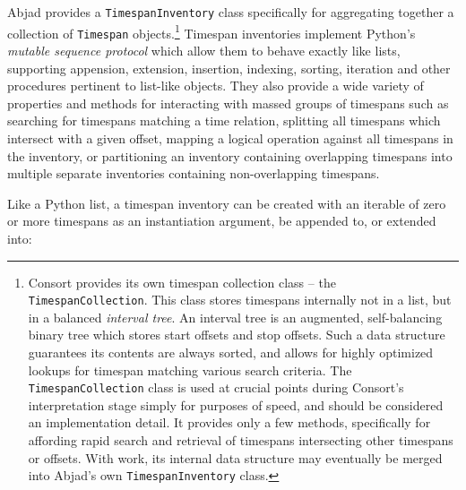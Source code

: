 
Abjad provides a \texttt{TimespanInventory} class specifically for aggregating
together a collection of \texttt{Timespan} objects.\footnote{ Consort provides
its own timespan collection class -- the \texttt{TimespanCollection}. This
class stores timespans internally not in a list, but in a balanced
\emph{interval tree}. An interval tree is an augmented, self-balancing binary
tree which stores start offsets and stop offsets. Such a data structure
guarantees its contents are always sorted, and allows for highly optimized
lookups for timespan matching various search criteria. The
\texttt{TimespanCollection} class is used at crucial points during Consort's
interpretation stage simply for purposes of speed, and should be considered an
implementation detail. It provides only a few methods, specifically for
affording rapid search and retrieval of timespans intersecting other timespans
or offsets. With work, its internal data structure may eventually be merged into
Abjad's own \texttt{TimespanInventory} class.} Timespan inventories implement
Python's \emph{mutable sequence protocol} which allow them to behave exactly
like lists, supporting appension, extension, insertion, indexing, sorting,
iteration and other procedures pertinent to list-like objects. They also
provide a wide variety of properties and methods for interacting with massed
groups of timespans such as searching for timespans matching a time relation,
splitting all timespans which intersect with a given offset, mapping a logical
operation against all timespans in the inventory, or partitioning an
inventory containing overlapping timespans into multiple separate inventories
containing non-overlapping timespans.

Like a Python list, a timespan inventory can be created with an iterable of
zero or more timespans as an instantiation argument, be appended to, or
extended into:

\begin{comment}
<abjad>
timespan_inventory = timespantools.TimespanInventory([
    timespantools.Timespan(0, 16),
    ])
timespan_inventory.append(timespantools.Timespan(5, 12))
timespan_inventory.extend([
    timespantools.Timespan(-2, 8),
    timespantools.Timespan(15, 20),
    ])
print(format(timespan_inventory))
show(timespan_inventory)
</abjad>
\end{comment}

